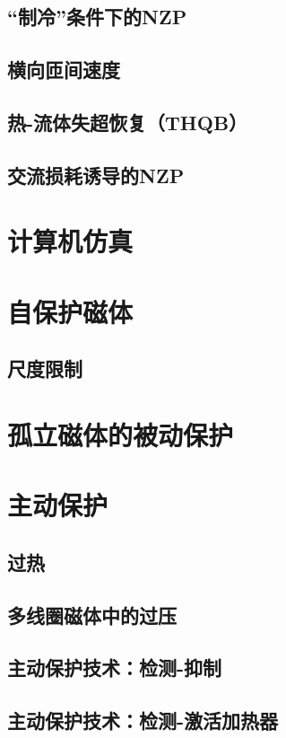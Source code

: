 \subsection{“制冷”条件下的NZP}
\subsection{横向匝间速度}
\subsection{热-流体失超恢复（THQB）}
\subsection{交流损耗诱导的NZP}

\section{计算机仿真}

\section{自保护磁体}
\subsection{尺度限制}

\section{孤立磁体的被动保护}


\section{主动保护}
\subsection{过热}
\subsection{多线圈磁体中的过压}
\subsection{主动保护技术：检测-抑制}
\subsection{主动保护技术：检测-激活加热器}

